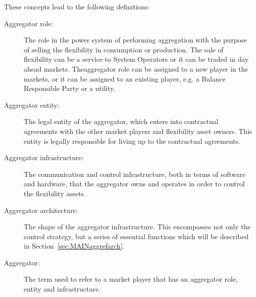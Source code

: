 These concepts lead to the following definitions:
\begin{description}
	\item[Aggregator role:] The role in the power system of performing aggregation with the purpose of selling the flexibility in consumption or production. The sale of flexibility can be a service to System Operators or it can be traded in day ahead markets. Theaggregator role can be assigned to a new player in the markets, or it can be assigned to an existing player, e.g. a Balance Responsible Party or a utility.
	\item[Aggregator entity:] The legal entity of the aggregator, which enters into contractual agreements with the other market players and flexibility asset owners. This entity is legally responsible for living up to the contractual agreements.
	\item[Aggregator infrastructure:] The communication and control infrastructure, both in terms of software and hardware, that the aggregator owns and operates in order to control the flexibility assets. 
	\item[Aggregator architecture:] The shape of the aggregator infrastructure. This encompasses not only the control strategy, but a series of essential functions which will be described in Section~\ref{sec:MAINaggrefarch}.
	\item[Aggregator:] The term used to refer to a market player that has an aggregator role, entity and infrastructure.
\end{description}

